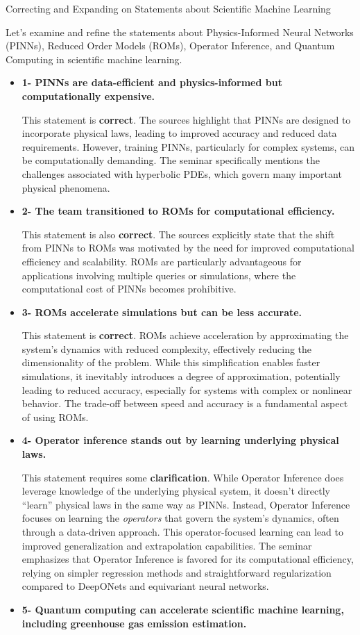 \documentclass[
]{article}
\author{}
\date{}
\begin{document}
{Correcting and Expanding on Statements about Scientific
Machine
Learning}\label{correcting-and-expanding-on-statements-about-scientific-machine-learning}

Let's examine and refine the statements about Physics-Informed Neural
Networks (PINNs), Reduced Order Models (ROMs), Operator Inference, and
Quantum Computing in scientific machine learning.

\begin{itemize}
\item
  \textbf{1- PINNs are data-efficient and physics-informed but
  computationally expensive.}

  This statement is \textbf{correct}. The sources highlight that PINNs
  are designed to incorporate physical laws, leading to improved
  accuracy and reduced data requirements. However, training PINNs,
  particularly for complex systems, can be computationally demanding.
  The seminar specifically mentions the challenges associated with
  hyperbolic PDEs, which govern many important physical phenomena.
\item
  \textbf{2- The team transitioned to ROMs for computational
  efficiency.}

  This statement is also \textbf{correct}. The sources explicitly state
  that the shift from PINNs to ROMs was motivated by the need for
  improved computational efficiency and scalability. ROMs are
  particularly advantageous for applications involving multiple queries
  or simulations, where the computational cost of PINNs becomes
  prohibitive.
\item
  \textbf{3- ROMs accelerate simulations but can be less accurate.}

  This statement is \textbf{correct}. ROMs achieve acceleration by
  approximating the system's dynamics with reduced complexity,
  effectively reducing the dimensionality of the problem. While this
  simplification enables faster simulations, it inevitably introduces a
  degree of approximation, potentially leading to reduced accuracy,
  especially for systems with complex or nonlinear behavior. The
  trade-off between speed and accuracy is a fundamental aspect of using
  ROMs.
\item
  \textbf{4- Operator inference stands out by learning underlying
  physical laws.}

  This statement requires some \textbf{clarification}. While Operator
  Inference does leverage knowledge of the underlying physical system,
  it doesn't directly ``learn'' physical laws in the same way as PINNs.
  Instead, Operator Inference focuses on learning the \emph{operators}
  that govern the system's dynamics, often through a data-driven
  approach. This operator-focused learning can lead to improved
  generalization and extrapolation capabilities. The seminar emphasizes
  that Operator Inference is favored for its computational efficiency,
  relying on simpler regression methods and straightforward
  regularization compared to DeepONets and equivariant neural networks.
\item
  \textbf{5- Quantum computing can accelerate scientific machine
  learning, including greenhouse gas emission estimation.}


\end{itemize}
\end{document}
